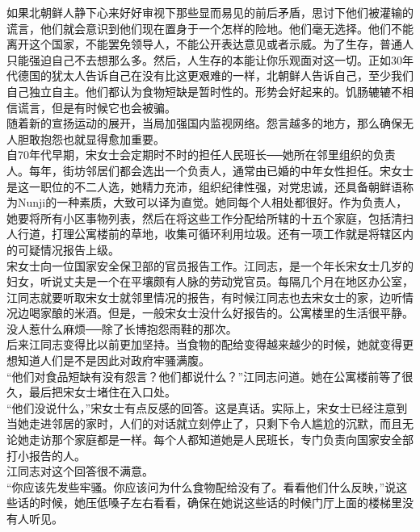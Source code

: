 如果北朝鲜人静下心来好好审视下那些显而易见的前后矛盾，思讨下他们被灌输的谎言，他们就会意识到他们现在置身于一个怎样的险地。他们毫无选择。他们不能离开这个国家，不能罢免领导人，不能公开表达意见或者示威。为了生存，普通人只能强迫自己不去想那么多。然后，人生存的本能让你乐观面对这一切。正如30年代德国的犹太人告诉自己在没有比这更艰难的一样，北朝鲜人告诉自己，至少我们自己独立自主。他们都认为食物短缺是暂时性的。形势会好起来的。饥肠辘辘不相信谎言，但是有时候它也会被骗。\\

随着新的宣扬运动的展开，当局加强国内监视网络。怨言越多的地方，那么确保无人胆敢抱怨也就显得愈加重要。\\

自70年代早期，宋女士会定期时不时的担任人民班长──她所在邻里组织的负责人。每年，街坊邻居们都会选出一个负责人，通常由已婚的中年女性担任。宋女士是这一职位的不二人选，她精力充沛，组织纪律性强，对党忠诚，还具备朝鲜语称为Nunji的一种素质，大致可以译为直觉。她同每个人相处都很好。作为负责人，她要将所有小区事物列表，然后在将这些工作分配给所辖的十五个家庭，包括清扫人行道，打理公寓楼前的草地，收集可循环利用垃圾。还有一项工作就是将辖区内的可疑情况报告上级。\\

宋女士向一位国家安全保卫部的官员报告工作。江同志，是一个年长宋女士几岁的妇女，听说丈夫是一个在平壤颇有人脉的劳动党官员。每隔几个月在地区办公室，江同志就要听取宋女士就邻里情况的报告，有时候江同志也去宋女士的家，边听情况边喝家酿的米酒。但是，一般宋女士没什么好报告的。公寓楼里的生活很平静。没人惹什么麻烦──除了长博抱怨雨鞋的那次。\\

后来江同志变得比以前更加坚持。当食物的配给变得越来越少的时候，她就变得更想知道人们是不是因此对政府牢骚满腹。\\

“他们对食品短缺有没有怨言？他们都说什么？”江同志问道。她在公寓楼前等了很久，最后把宋女士堵住在入口处。\\

“他们没说什么，”宋女士有点反感的回答。这是真话。实际上，宋女士已经注意到当她走进邻居的家时，人们的对话就立刻停止了，只剩下令人尴尬的沉默，而且无论她走访那个家庭都是一样。每个人都知道她是人民班长，专门负责向国家安全部打小报告的人。\\

江同志对这个回答很不满意。\\

“你应该先发些牢骚。你应该问为什么食物配给没有了。看看他们什么反映，”说这些话的时候，她压低嗓子左右看看，确保在她说这些话的时候门厅上面的楼梯里没有人听见。\\

